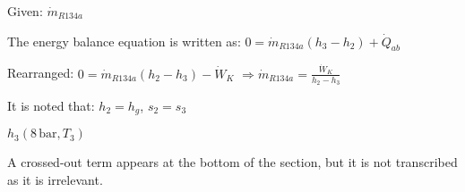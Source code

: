 Given: \( \dot{m}_{R134a} \)  

The energy balance equation is written as:  
\( 0 = \dot{m}_{R134a} (h_3 - h_2) + \dot{Q}_{ab} \)  

Rearranged:  
\( 0 = \dot{m}_{R134a} (h_2 - h_3) - \dot{W}_K \)  
\( \Rightarrow \dot{m}_{R134a} = \frac{\dot{W}_K}{h_2 - h_3} \)  

It is noted that:  
\( h_2 = h_g \), \( s_2 = s_3 \)  

\( h_3 (8 \, \text{bar}, T_3) \)  

A crossed-out term appears at the bottom of the section, but it is not transcribed as it is irrelevant.